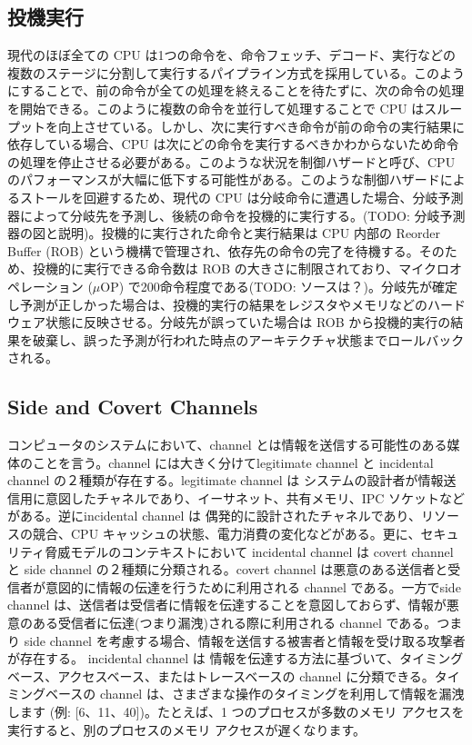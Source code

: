 \documentclass[submit]{ipsj}
\begin{document}
\subsection{投機実行}
現代のほぼ全ての CPU は1つの命令を、命令フェッチ、デコード、実行などの複数のステージに分割して実行するパイプライン方式を採用している。このようにすることで、前の命令が全ての処理を終えることを待たずに、次の命令の処理を開始できる。このように複数の命令を並行して処理することで CPU はスループットを向上させている。しかし、次に実行すべき命令が前の命令の実行結果に依存している場合、CPU は次にどの命令を実行するべきかわからないため命令の処理を停止させる必要がある。このような状況を制御ハザードと呼び、CPU のパフォーマンスが大幅に低下する可能性がある。このような制御ハザードによるストールを回避するため、現代の CPU は分岐命令に遭遇した場合、分岐予測器によって分岐先を予測し、後続の命令を投機的に実行する。{\color{red}(TODO: 分岐予測器の図と説明)}。投機的に実行された命令と実行結果は CPU 内部の Reorder Buffer (ROB) という機構で管理され、依存先の命令の完了を待機する。そのため、投機的に実行できる命令数は ROB の大きさに制限されており、マイクロオペレーション ($\mu$OP) で200命令程度である{\color{red}(TODO: ソースは？)}。分岐先が確定し予測が正しかった場合は、投機的実行の結果をレジスタやメモリなどのハードウェア状態に反映させる。分岐先が誤っていた場合は ROB から投機的実行の結果を破棄し、誤った予測が行われた時点のアーキテクチャ状態までロールバックされる。

\subsection{Side and Covert Channels}
コンピュータのシステムにおいて、channel とは情報を送信する可能性のある媒体のことを言う。channel には大きく分けてlegitimate channel と incidental channel の２種類が存在する。legitimate channel は システムの設計者が情報送信用に意図したチャネルであり、イーサネット、共有メモリ、IPC ソケットなどがある。逆にincidental channel は 偶発的に設計されたチャネルであり、リソースの競合、CPU キャッシュの状態、電力消費の変化などがある。更に、セキュリティ脅威モデルのコンテキストにおいて incidental channel は covert channel と side channel の２種類に分類される。covert channel は悪意のある送信者と受信者が意図的に情報の伝達を行うために利用される channel である。一方でside channel は、送信者は受信者に情報を伝達することを意図しておらず、情報が悪意のある受信者に伝達(つまり漏洩)される際に利用される channel である。つまり side channel を考慮する場合、情報を送信する被害者と情報を受け取る攻撃者が存在する。 incidental channel は 情報を伝達する方法に基づいて、タイミングベース、アクセスベース、またはトレースベースの channel に分類できる。タイミングベースの channel は、さまざまな操作のタイミングを利用して情報を漏洩します (例: [6、11、40])。たとえば、1 つのプロセスが多数のメモリ アクセスを実行すると、別のプロセスのメモリ アクセスが遅くなります。 
\end{document}
